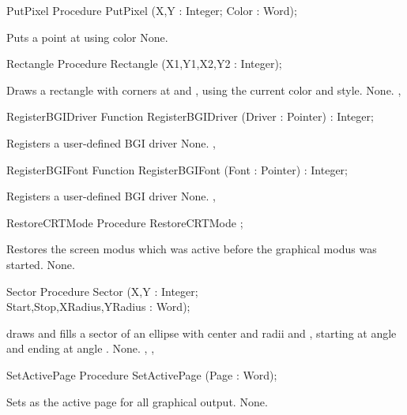 \begin{procedure}{PutPixel}
\Declaration
Procedure PutPixel (X,Y : Integer; Color : Word);

\Description
Puts a point at
 using color 
\Errors
None.
\SeeAlso
{}
\end{procedure}
\begin{procedure}{Rectangle}
\Declaration
Procedure Rectangle (X1,Y1,X2,Y2 : Integer);

\Description
Draws a rectangle with
corners at  and , using the current color and
style.
\Errors
None.
\SeeAlso
{}, 
\end{procedure}
\begin{function}{RegisterBGIDriver}
\Declaration
Function RegisterBGIDriver (Driver : Pointer) : Integer;

\Description
Registers a user-defined BGI driver
\Errors
None.
\SeeAlso
{},
\end{function}
\begin{function}{RegisterBGIFont}
\Declaration
Function RegisterBGIFont (Font : Pointer) : Integer;

\Description
Registers a user-defined BGI driver
\Errors
None.
\SeeAlso
{},
\end{function}
\begin{procedure}{RestoreCRTMode}
\Declaration
Procedure RestoreCRTMode ;

\Description
Restores the screen modus which was active before
the graphical modus was started.
\Errors
None.
\SeeAlso
{}
\end{procedure}
\begin{procedure}{Sector}
\Declaration
Procedure Sector (X,Y : Integer; \\ Start,Stop,XRadius,YRadius : Word);

\Description
{}
draws and fills a sector of an ellipse  with center  and radii
 and , starting at angle  and ending at angle .
\Errors
None.
\SeeAlso
{}, , 
\end{procedure}
\begin{procedure}{SetActivePage}
\Declaration
Procedure SetActivePage (Page : Word);

\Description
Sets  as the active page 
for all graphical output.
\Errors
None.
\SeeAlso

\end{procedure}
